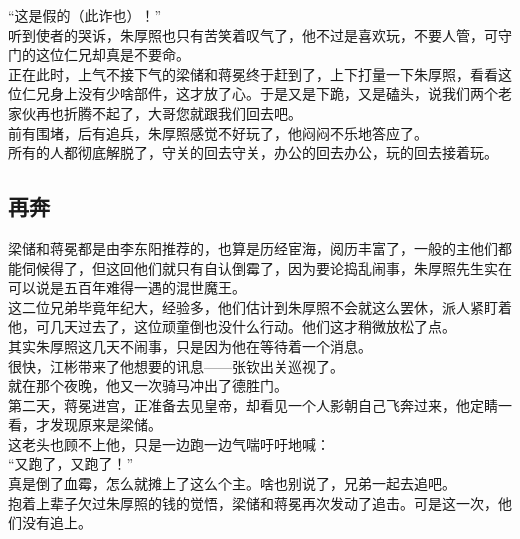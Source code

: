 \begin{multicols}{\theparacolNo}
“这是假的（此诈也）！”\\

听到使者的哭诉，朱厚照也只有苦笑着叹气了，他不过是喜欢玩，不要人管，可守门的这位仁兄却真是不要命。\\

正在此时，上气不接下气的梁储和蒋冕终于赶到了，上下打量一下朱厚照，看看这位仁兄身上没有少啥部件，这才放了心。于是又是下跪，又是磕头，说我们两个老家伙再也折腾不起了，大哥您就跟我们回去吧。\\

前有围堵，后有追兵，朱厚照感觉不好玩了，他闷闷不乐地答应了。\\

所有的人都彻底解脱了，守关的回去守关，办公的回去办公，玩的回去接着玩。\\

\subsection{再奔}
梁储和蒋冕都是由李东阳推荐的，也算是历经宦海，阅历丰富了，一般的主他们都能伺候得了，但这回他们就只有自认倒霉了，因为要论捣乱闹事，朱厚照先生实在可以说是五百年难得一遇的混世魔王。\\

这二位兄弟毕竟年纪大，经验多，他们估计到朱厚照不会就这么罢休，派人紧盯着他，可几天过去了，这位顽童倒也没什么行动。他们这才稍微放松了点。\\

其实朱厚照这几天不闹事，只是因为他在等待着一个消息。\\

很快，江彬带来了他想要的讯息——张钦出关巡视了。\\

就在那个夜晚，他又一次骑马冲出了德胜门。\\

第二天，蒋冕进宫，正准备去见皇帝，却看见一个人影朝自己飞奔过来，他定睛一看，才发现原来是梁储。\\

这老头也顾不上他，只是一边跑一边气喘吁吁地喊：\\

“又跑了，又跑了！”\\

真是倒了血霉，怎么就摊上了这么个主。啥也别说了，兄弟一起去追吧。\\

抱着上辈子欠过朱厚照的钱的觉悟，梁储和蒋冕再次发动了追击。可是这一次，他们没有追上。\\


\end{multicols}
